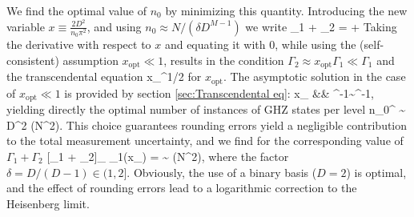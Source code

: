 We find the optimal value of $n_0$ by minimizing this quantity. Introducing the new variable $x \equiv \frac{2D^2}{n_0\pi^2}$, and using $ n_0 \approx N/(\delta D^{M-1})$ we write
\bel
	\Gamma_1 + \Gamma_2 =  +
	 
	\exp{}
\eel
Taking the derivative with respect to $x$ and equating it with 0, while using
the (self-consistent) assumption $x_\mathrm{opt} \ll 1$, results in the condition $\Gamma_2 \approx
x_\mathrm{opt} \Gamma_1  \ll \Gamma_1$ and the transcendental equation
\bel
	x_^{1/2} \approx {} \exp{}
\eel
for $x_\mathrm{opt}$.
The asymptotic solution in the case of $x_\mathrm{opt} \ll 1$ is provided by
section \ref{sec:Transcendental eq}:
\bal
	x_ &\approx& ^{-1}\sim{}^{-1},
\eal
yielding directly the optimal number of instances of GHZ states per level
\bal
\label{eq:EK6}
	n_0^ \sim {} D^2 \log\left(N^2\right).
\eal
This choice guarantees rounding errors yield a negligible contribution to the total measurement uncertainty, and we find
for the corresponding value of $\Gamma_1 + \Gamma_2$ 
\bel
	\label{eq:Gamma1_Gamma2}
	[\Gamma_1 + \Gamma_2]_ \approx \Gamma_1(x_) 
	=
	\sim
	\log\left(N^2\right),
\eel
where the factor $\delta=D/(D-1) \in (1,2]$.
Obviously, the use of a binary basis  ($D=2$) is optimal, and the effect of rounding errors lead to a logarithmic correction to the Heisenberg limit.

